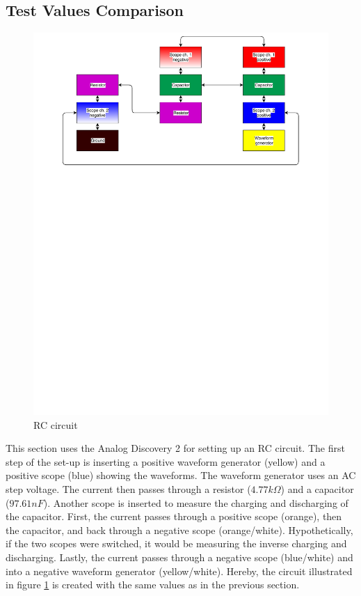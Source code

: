 \subsection{Test Values Comparison}
\begin{figure}[H]
	\center
		\includegraphics[clip, trim=0cm 18cm 0cm 0cm, scale=0.5]{fig/img/test_circuit_1}
	\caption{RC circuit}
	\label{rc_flow}
\end{figure}
This section uses the Analog Discovery 2 for setting up an RC circuit. The first step of the set-up is inserting a positive waveform generator (yellow) and a positive scope (blue) showing the waveforms. The waveform generator uses an AC step voltage. The current then passes through a resistor ($4.77 k\Omega$) and a capacitor ($97.61 nF$). Another scope is inserted to measure the charging and discharging of the capacitor. First, the current passes through a positive scope (orange), then the capacitor, and back through a negative scope (orange/white). Hypothetically, if the two scopes were switched, it would be measuring the inverse charging and discharging. Lastly, the current passes through a negative scope (blue/white) and into a negative waveform generator (yellow/white). Hereby, the circuit illustrated in figure \ref{rc_flow} is created with the same values as in the previous section. \\ \\
